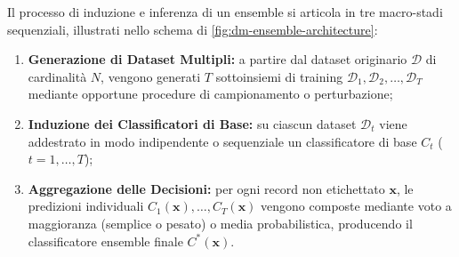 Il processo di induzione e inferenza di un ensemble si articola in tre macro-stadi sequenziali, illustrati nello schema di \autoref{fig:dm-ensemble-architecture}:
\begin{enumerate}
    \item \textbf{Generazione di Dataset Multipli:} a partire dal dataset originario $\mathcal{D}$ di cardinalità $N$, vengono generati $T$ sottoinsiemi di training $\mathcal{D}_1, \mathcal{D}_2, \dots, \mathcal{D}_T$ mediante opportune procedure di campionamento o perturbazione;
    \item \textbf{Induzione dei Classificatori di Base:} su ciascun dataset $\mathcal{D}_t$ viene addestrato in modo indipendente o sequenziale un classificatore di base $C_t$ ($t = 1, \dots, T$);
    \item \textbf{Aggregazione delle Decisioni:} per ogni record non etichettato $\mathbf{x}$, le predizioni individuali $C_1(\mathbf{x}), \dots, C_T(\mathbf{x})$ vengono composte mediante voto a maggioranza (semplice o pesato) o media probabilistica, producendo il classificatore ensemble finale $C^*(\mathbf{x})$.
\end{enumerate}

